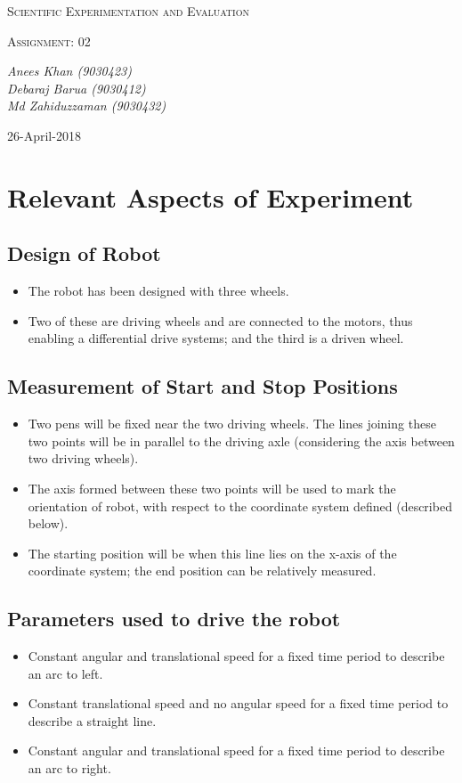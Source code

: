 \documentclass[10pt,a4paper]{article}
\begin{document}
	\begin{titlepage}
	\centering

		{\scshape\LARGE Scientific Experimentation and Evaluation\par}

		{\scshape\Large Assignment: 02\par}

		\vfill

		\vfill
		{\Large\itshape Anees Khan (9030423)
			\\Debaraj Barua (9030412)\\
			Md Zahiduzzaman (9030432)
			\par}
		\vfill

		{\large 26-April-2018\par}
	\end{titlepage}
	\tableofcontents
	\section{Relevant Aspects of Experiment}
	\subsection{Design of Robot}
		\begin{itemize}
			\item The robot has been designed with three wheels.
			\item Two of these are driving wheels and are connected to the motors, thus enabling a differential drive systems; and the third is a driven wheel.
		\end{itemize}
	\subsection{Measurement of Start and Stop Positions}
		\begin{itemize}
			\item Two pens will be fixed near the two driving wheels. The lines joining these two points will be in parallel to the driving axle (considering the axis between two driving wheels).
			\item The axis formed between these two points will be used to mark the orientation of robot, with respect to the coordinate system defined (described below).
			\item The starting position will be when this line lies on the x-axis of the coordinate system; the end position can be relatively measured.
		\end{itemize}
	\subsection{Parameters used to drive the robot}
		\begin{itemize}
			\item Constant angular and translational speed for a fixed time period to describe an arc to left.
			\item Constant translational speed and no angular speed for a fixed time period to describe a straight line.
			\item Constant angular and translational speed for a fixed time period to describe an arc to right.
		\end{itemize}
\end{document}
